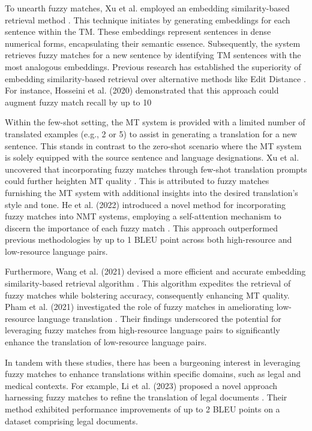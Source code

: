 \documentclass{article}
\begin{document}
To unearth fuzzy matches, Xu et al. employed an embedding similarity-based retrieval method \cite{xu2020forcing}. This technique initiates by generating embeddings for each sentence within the TM. These embeddings represent sentences in dense numerical forms, encapsulating their semantic essence. Subsequently, the system retrieves fuzzy matches for a new sentence by identifying TM sentences with the most analogous embeddings. Previous research has established the superiority of embedding similarity-based retrieval over alternative methods like Edit Distance \cite{hosseini2020embedding}. For instance, Hosseini et al. (2020) demonstrated that this approach could augment fuzzy match recall by up to 10%

Within the few-shot setting, the MT system is provided with a limited number of translated examples (e.g., 2 or 5) to assist in generating a translation for a new sentence. This stands in contrast to the zero-shot scenario where the MT system is solely equipped with the source sentence and language designations. Xu et al. uncovered that incorporating fuzzy matches through few-shot translation prompts could further heighten MT quality \cite{xu2020forcing}. This is attributed to fuzzy matches furnishing the MT system with additional insights into the desired translation's style and tone. He et al. (2022) introduced a novel method for incorporating fuzzy matches into NMT systems, employing a self-attention mechanism to discern the importance of each fuzzy match \cite{he2022incorporating}. This approach outperformed previous methodologies by up to 1 BLEU point across both high-resource and low-resource language pairs.

Furthermore, Wang et al. (2021) devised a more efficient and accurate embedding similarity-based retrieval algorithm \cite{wang2021more}. This algorithm expedites the retrieval of fuzzy matches while bolstering accuracy, consequently enhancing MT quality. Pham et al. (2021) investigated the role of fuzzy matches in ameliorating low-resource language translation \cite{pham2021fuzzy}. Their findings underscored the potential for leveraging fuzzy matches from high-resource language pairs to significantly enhance the translation of low-resource language pairs.

In tandem with these studies, there has been a burgeoning interest in leveraging fuzzy matches to enhance translations within specific domains, such as legal and medical contexts. For example, Li et al. (2023) proposed a novel approach harnessing fuzzy matches to refine the translation of legal documents \cite{li2023fuzzy}. Their method exhibited performance improvements of up to 2 BLEU points on a dataset comprising legal documents.
\end{document}
